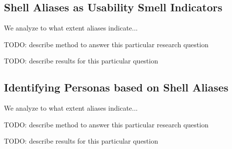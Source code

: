 \subsection{Shell Aliases as Usability Smell Indicators}

We analyze to what extent aliases indicate...

TODO: describe method to answer this particular research question

TODO: describe results for this particular question

\subsection{Identifying Personas based on Shell Aliases}


We analyze to what extent aliases indicate...

TODO: describe method to answer this particular research question

TODO: describe results for this particular question
